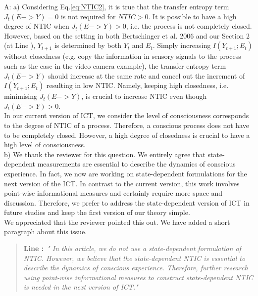 \documentclass[utf8]{article}
\newenvironment{ans}  
    {\color{Black}\noindent A:}
    {~\newline}
\newcommand{\addnew}[2]{\blockcquote{}{\textbf{Line #1:}~\newline\textit{"#2"}}
}
\begin{document}
    	\begin{ans}
    		\newline
    		a) Considering Eq.\ref{eq:NTIC2}, it is true that the transfer entropy term $J_t(E -> Y)=0$ is not required for $NTIC>0$. It is possible to have a high degree of NTIC when $J_t(E -> Y) > 0$, i.e. the process is not completely closed.  \\
    		However, based on the setting in both Bertschinger et al. 2006 and our Section 2 (at Line ), $Y_{t+1}$ is determined by both $Y_t$ and $E_t$. Simply increasing $I(Y_{t+1}; E_t)$ without closedness (e.g, copy the information in sensory signals to the process such as the case in the video camera example), the transfer entropy term $J_t(E -> Y)$ should increase at the same rate and cancel out the increment of $I(Y_{t+1}; E_t)$ resulting in low NTIC. Namely, keeping high closedness, i.e. minimising $J_t(E -> Y)$, is crucial to increase NTIC even though $J_t(E -> Y) > 0$.\\
    		In our current version of ICT, we consider the level of consciousness corresponds to the degree of NTIC of a process. Therefore, a conscious process does not have to be completely closed. However, a high degree of closedness is crucial to have a high level of consciousness.\\
    		
    		\noindent
    		b) We thank the reviewer for this question. We entirely agree that state-dependent measurements are essential to describe the dynamics of conscious experience. In fact, we now are working on state-dependent formulations for the next version of the ICT. In contrast to the current version, this work involves point-wise informational measures and certainly require more space and discussion. Therefore, we prefer to address the state-dependent version of ICT in future studies and keep the first version of our theory simple.\\
    		We appreciated that the reviewer pointed this out. We have added a short paragraph about this issue.
    	
	    	\addnew{}{
	    		In this article, we do not use a state-dependent formulation of NTIC. However, we believe that the state-dependent NTIC is essential to describe the dynamics of conscious experience. Therefore, further research using point-wise informational measures to construct state-dependent NTIC is needed in the next version of ICT.}

    	\end{ans}
        
\end{document}
